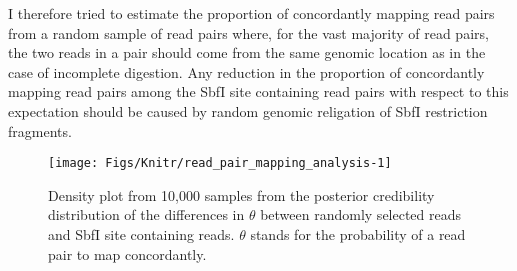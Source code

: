 \documentclass[a4paper,12pt,times,authoryear,twoside,print,index]{Classes/PhDThesisPSnPDF}\usepackage[]{graphicx}\usepackage[]{color}
\newenvironment{knitrout}{}{} %
\begin{document}
%
%
%

I therefore tried to estimate the proportion of \gls{concordant}ly mapping read pairs from a random sample of read pairs where, for the vast majority of read pairs, the two reads in a pair should come from the same genomic location as in the case of incomplete digestion. Any reduction in the proportion of \gls{concordant}ly mapping read pairs among the SbfI site containing read pairs with respect to this expectation should be caused by random genomic religation of SbfI restriction fragments. 
%
\begin{figure}
\begin{knitrout}
\color{fgcolor}

{\centering \texttt{[image: Figs/Knitr/read\_pair\_mapping\_analysis-1]} 

}



\end{knitrout}
\caption{Density plot from 10,000 samples from the posterior credibility distribution of the differences in $\theta$ between randomly selected reads and SbfI site containing reads. $\theta$ stands for the probability of a read pair to map concordantly.}
\label{fig:read_pair_mapping_analysis}
\end{figure}
%
\end{document}
